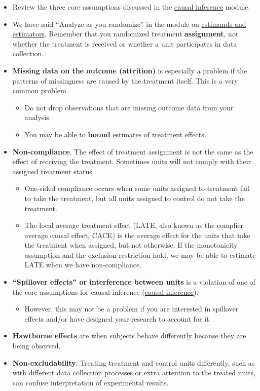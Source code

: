 \documentclass[12pt,]{book}
\providecommand{\tightlist}{%
  \setlength{\itemsep}{0pt}\setlength{\parskip}{0pt}}
\begin{document}
\begin{itemize}
\item
  Review the three core assumptions discussed in the \href{causal-inference.html}{causal inference} module.
\item
  We have said ``Analyze as you randomize'' in the module on \href{estimands-and-estimators.html}{estimands and estimators}. Remember that you randomized treatment \textbf{assignment}, not whether the treatment is received or whether a unit participates in data collection.
\item
  \textbf{Missing data on the outcome (attrition)} is especially a problem if the patterns of missingness are caused by the treatment itself. This is a very common problem.

  \begin{itemize}
  \item
    Do not drop observations that are missing outcome data from your analysis.
  \item
    You may be able to \textbf{bound} estimates of treatment effects.
  \end{itemize}
\item
  \textbf{Non-compliance}. The effect of treatment assignment is not the same as the effect of receiving the treatment. Sometimes units will not comply with their assigned treatment status.

  \begin{itemize}
  \item
    One-sided compliance occurs when some units assigned to treatment fail to take the treatment, but all units assigned to control do not take the treatment.
  \item
    The local average treatment effect (LATE, also known as the complier average causal effect, CACE) is the average effect for the units that take the treatment when assigned, but not otherwise. If the monotonicity assumption and the exclusion restriction hold, we may be able to estimate LATE when we have non-compliance.
  \end{itemize}
\item
  \textbf{``Spillover effects'' or interference between units} is a violation of one of the core assumptions for causal inference (\href{causalinference.html}{causal inference}).

  \begin{itemize}
  \tightlist
  \item
    However, this may not be a problem if you are interested in spillover effects and/or have designed your research to account for it.
  \end{itemize}
\item
  \textbf{Hawthorne effects} are when subjects behave differently because they are being observed.
\item
  \textbf{Non-excludability}. Treating treatment and control units differently, such as with different data collection processes or extra attention to the treated units, can confuse interpretation of experimental results.


\end{itemize}
\end{document}
